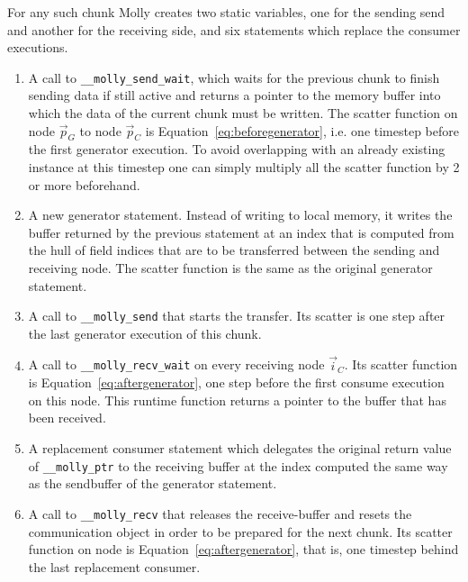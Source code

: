 \documentclass{sigplanconf}
\begin{document}
For any such chunk Molly creates two static variables, one for the sending send and another for the receiving side, and six statements which replace the consumer executions.



\begin{enumerate}
\item A call to \texttt{\_\_molly\_send\_wait}, which waits for the previous chunk to finish sending data if still active and returns a pointer to the memory buffer into which the data of the current chunk must be written. The scatter function on node $\vec p_G$ to node $\vec p_C$ is Equation~\ref{eq:beforegenerator}, i.e. one timestep before the first generator execution. To avoid overlapping with an already existing instance at this timestep one can simply multiply all the scatter function by 2 or more beforehand.

\item A new generator statement. Instead of writing to local memory, it writes the buffer returned by the previous statement at an index that is computed from the hull of field indices that are to be transferred between the sending and receiving node. The scatter function is the same as the original generator statement.

\item A call to \texttt{\_\_molly\_send} that starts the transfer. Its scatter is one step after the last generator execution of this chunk.

\item A call to \texttt{\_\_molly\_recv\_wait} on every receiving node $\vec i_C$. Its scatter function is Equation~\ref{eq:aftergenerator}, one step before the first consume execution on this node. This runtime function returns a pointer to the buffer that has been received.

\item A replacement consumer statement which delegates the original return value of \texttt{\_\_molly\_ptr} to the receiving buffer at the index computed the same way as the sendbuffer of the generator statement.

\item A call to \texttt{\_\_molly\_recv} that releases the receive-buffer and resets the communication object in order to be prepared for the next chunk. Its scatter function on node is Equation~\ref{eq:aftergenerator}, that is, one timestep behind the last replacement consumer.

\end{enumerate} 
\end{document}
